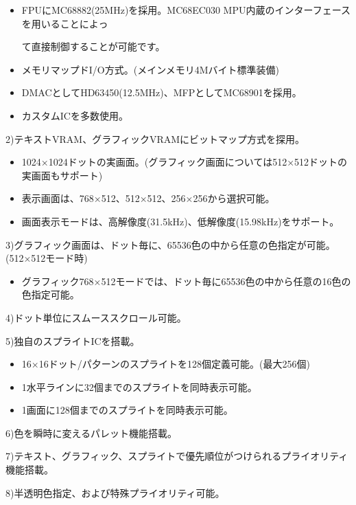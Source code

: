 ﻿\documentclass[twoside,a4paper,12pt]{article}
\begin{document}
\begin{itemize}[leftmargin=30mm, itemsep=-1mm, topsep=1mm]
\item
FPUにMC68882(25MHz)を採用。MC68EC030 MPU内蔵のインターフェースを用いることによっ

て直接制御することが可能です。
\item
メモリマップドI/O方式。(メインメモリ4Mバイト標準装備)
\item
DMACとしてHD63450(12.5MHz)、MFPとしてMC68901を採用。
\item
カスタムICを多数使用。
\end{itemize}

2)テキストVRAM、グラフィックVRAMにビットマップ方式を探用。

\begin{itemize}[leftmargin=30mm, itemsep=-1mm, topsep=1mm]
\item
1024×1024ドットの実画面。(グラフィック画面については512×512ドットの実画面もサポート)
\item
表示画面は、768×512、512×512、256×256から選択可能。
\item
画面表示モードは、高解像度(31.5kHz)、低解像度(15.98kHz)をサポート。
\end{itemize}

3)グラフィック画面は、ドット毎に、65536色の中から任意の色指定が可能。(512×512モード時)

\begin{itemize}[leftmargin=30mm, itemsep=-1mm, topsep=1mm]
\item
グラフィック768×512モードでは、ドット毎に65536色の中から任意の16色の色指定可能。
\end{itemize}

4)ドット単位にスムーススクロール可能。

5)独自のスプライトICを搭載。

\begin{itemize}[leftmargin=30mm, itemsep=-1mm, topsep=1mm]
\item
16×16ドット/パ夕ーンのスプライトを128個定義可能。(最大256個)
\item
1水平ラインに32個までのスプライトを同時表示可能。
\item
1画面に128個までのスプライトを同時表示可能。
\end{itemize}

6)色を瞬時に変えるパレット機能搭載。

7)テキスト、グラフィック、スプライトで優先順位がつけられるプライオリティ機能搭載。

8)半透明色指定、および特殊プライオリティ可能。
\end{document}
